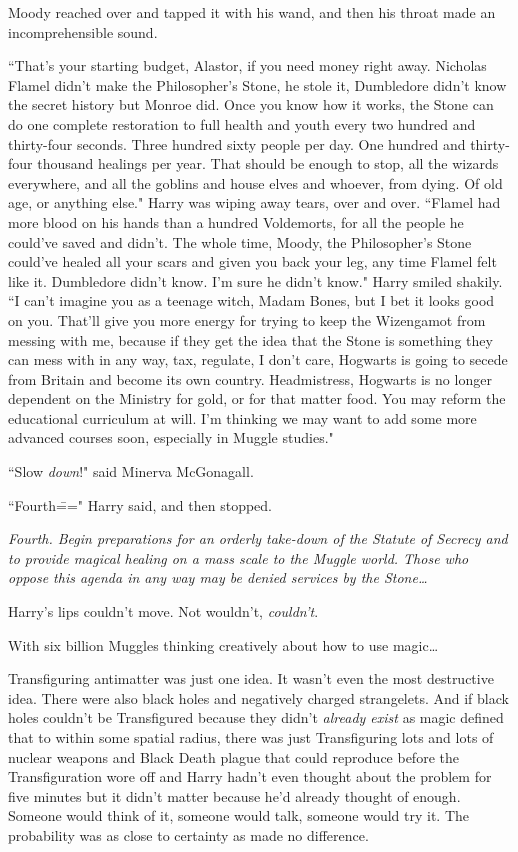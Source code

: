 Moody reached over and tapped it with his wand, and then his throat made an incomprehensible sound.

``That's your starting budget, Alastor, if you need money right away. Nicholas Flamel didn't make the Philosopher's Stone, he stole it, Dumbledore didn't know the secret history but Monroe did. Once you know how it works, the Stone can do one complete restoration to full health and youth every two hundred and thirty-four seconds. Three hundred sixty people per day. One hundred and thirty-four thousand healings per year. That should be enough to stop, all the wizards everywhere, and all the goblins and house elves and whoever, from dying. Of old age, or anything else." Harry was wiping away tears, over and over. ``Flamel had more blood on his hands than a hundred Voldemorts, for all the people he could've saved and didn't. The whole time, Moody, the Philosopher's Stone could've healed all your scars and given you back your leg, any time Flamel felt like it. Dumbledore didn't know. I'm sure he didn't know." Harry smiled shakily. ``I can't imagine you as a teenage witch, Madam Bones, but I bet it looks good on you. That'll give you more energy for trying to keep the Wizengamot from messing with me, because if they get the idea that the Stone is something they can mess with in any way, tax, regulate, I don't care, Hogwarts is going to secede from Britain and become its own country. Headmistress, Hogwarts is no longer dependent on the Ministry for gold, or for that matter food. You may reform the educational curriculum at will. I'm thinking we may want to add some more advanced courses soon, especially in Muggle studies."

``Slow \emph{down}!" said Minerva McGonagall.

``Fourth\===" Harry said, and then stopped.

\emph{Fourth. Begin preparations for an orderly take-down of the Statute of Secrecy and to provide magical healing on a mass scale to the Muggle world. Those who oppose this agenda in any way may be denied services by the Stone{\ldots}}

Harry's lips couldn't move. Not wouldn't, \emph{couldn't}.

With six billion Muggles thinking creatively about how to use magic{\ldots}

Transfiguring antimatter was just one idea. It wasn't even the most destructive idea. There were also black holes and negatively charged strangelets. And if black holes couldn't be Transfigured because they didn't \emph{already exist} as magic defined that to within some spatial radius, there was just Transfiguring lots and lots of nuclear weapons and Black Death plague that could reproduce before the Transfiguration wore off and Harry hadn't even thought about the problem for five minutes but it didn't matter because he'd already thought of enough. Someone would think of it, someone would talk, someone would try it. The probability was as close to certainty as made no difference.

